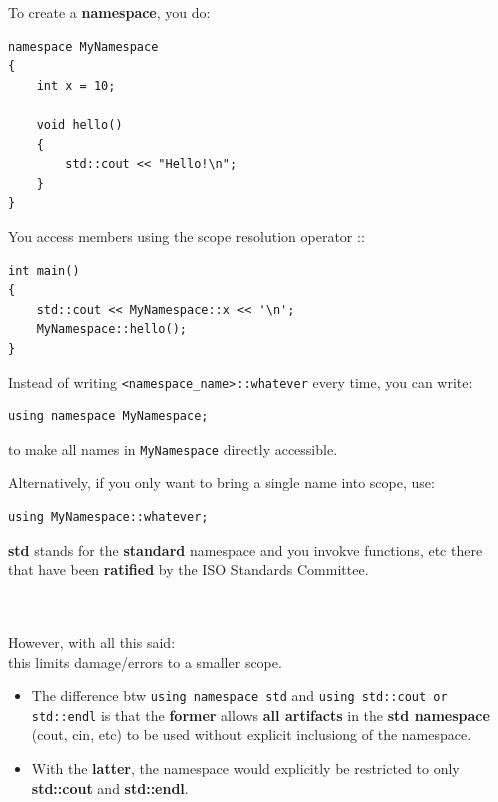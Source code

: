 \documentclass[10pt]{article}
\newcommand{\pbreak}{\vspace{30pt}}
\begin{document}
\pbreak 

To create a \textbf{namespace}, you do:

\begin{verbatim}
namespace MyNamespace
{
    int x = 10;

    void hello()
    {
        std::cout << "Hello!\n";
    }
}
\end{verbatim}

You access members using the scope resolution operator ::

\begin{verbatim}
int main()
{
    std::cout << MyNamespace::x << '\n';
    MyNamespace::hello();
}
\end{verbatim}

\pbreak

Instead of writing \verb|<namespace_name>::whatever| every time, you can write:

\begin{verbatim}
using namespace MyNamespace;
\end{verbatim}

to make all names in \verb|MyNamespace| directly accessible.

Alternatively, if you only want to bring a single name into scope, use:

\begin{verbatim}
using MyNamespace::whatever;
\end{verbatim}

\newpage 

\textbf{std} stands for the \textbf{standard} namespace and you invokve functions, etc there that have been \textbf{ratified} by the ISO Standards Committee.

\pbreak

\\

 \\ 


However, with all this said:\\
this limits damage/errors to a smaller scope.

\pbreak

\begin{itemize}
	\item The difference btw \verb|using namespace std| and \verb|using std::cout or std::endl| is that the \textbf{former} allows \textbf{all artifacts} in the \textbf{std namespace} (cout, cin, etc) to be used without explicit inclusiong of the namespace.
	\item With the \textbf{latter}, the namespace would explicitly be restricted to only \textbf{std::cout} and \textbf{std::endl}.
\end{itemize}
\end{document}
